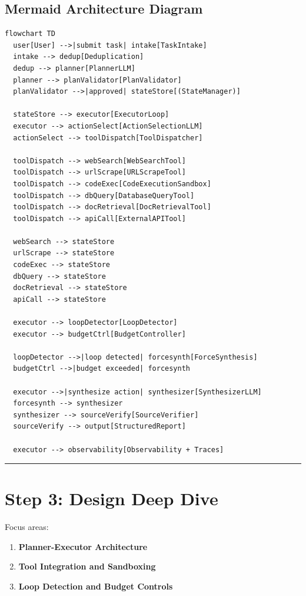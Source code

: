 \subsection*{Mermaid Architecture Diagram}

\begin{verbatim}
flowchart TD
  user[User] -->|submit task| intake[TaskIntake]
  intake --> dedup[Deduplication]
  dedup --> planner[PlannerLLM]
  planner --> planValidator[PlanValidator]
  planValidator -->|approved| stateStore[(StateManager)]

  stateStore --> executor[ExecutorLoop]
  executor --> actionSelect[ActionSelectionLLM]
  actionSelect --> toolDispatch[ToolDispatcher]

  toolDispatch --> webSearch[WebSearchTool]
  toolDispatch --> urlScrape[URLScrapeTool]
  toolDispatch --> codeExec[CodeExecutionSandbox]
  toolDispatch --> dbQuery[DatabaseQueryTool]
  toolDispatch --> docRetrieval[DocRetrievalTool]
  toolDispatch --> apiCall[ExternalAPITool]

  webSearch --> stateStore
  urlScrape --> stateStore
  codeExec --> stateStore
  dbQuery --> stateStore
  docRetrieval --> stateStore
  apiCall --> stateStore

  executor --> loopDetector[LoopDetector]
  executor --> budgetCtrl[BudgetController]

  loopDetector -->|loop detected| forcesynth[ForceSynthesis]
  budgetCtrl -->|budget exceeded| forcesynth

  executor -->|synthesize action| synthesizer[SynthesizerLLM]
  forcesynth --> synthesizer
  synthesizer --> sourceVerify[SourceVerifier]
  sourceVerify --> output[StructuredReport]

  executor --> observability[Observability + Traces]
\end{verbatim}

\bigskip\hrule\bigskip

\section*{Step 3: Design Deep Dive}

Focus areas:

\begin{enumerate}
  \item \textbf{Planner-Executor Architecture}
  \item \textbf{Tool Integration and Sandboxing}
  \item \textbf{Loop Detection and Budget Controls}
\end{enumerate}

